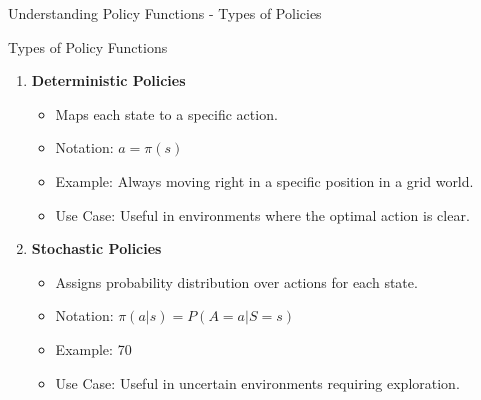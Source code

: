 \documentclass[aspectratio=169]{beamer}
\begin{document}
\begin{frame}[fragile]{Understanding Policy Functions - Types of Policies}
    \begin{block}{Types of Policy Functions}
        \begin{enumerate}
            \item \textbf{Deterministic Policies}
                \begin{itemize}
                    \item Maps each state to a specific action.
                    \item Notation: \( a = \pi(s) \)
                    \item Example: Always moving right in a specific position in a grid world.
                    \item Use Case: Useful in environments where the optimal action is clear.
                \end{itemize}
                
            \item \textbf{Stochastic Policies}
                \begin{itemize}
                    \item Assigns probability distribution over actions for each state.
                    \item Notation: \( \pi(a|s) = P(A = a | S = s) \)
                    \item Example: 70%
                    \item Use Case: Useful in uncertain environments requiring exploration.
                \end{itemize}
        \end{enumerate}
    \end{block}
\end{frame}
\end{document}
